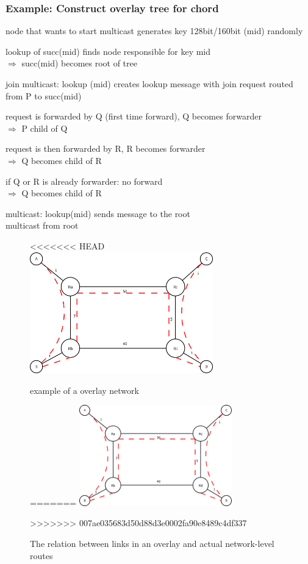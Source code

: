 \documentclass[ngerman,a4paper]{report}
\begin{document}
\subsubsection*{Example: Construct overlay tree for chord}  
\begin{compactitem}
	\item node that wants to start multicast generates key 128bit/160bit (mid) randomly
	\item lookup of succ(mid) finds node responsible for key mid\\
		$\Rightarrow$ succ(mid) becomes root of tree
	\item join multicast: lookup (mid) creates lookup message with join request routed from P to succ(mid)
	\item request is forwarded by Q (first time forward), Q becomes forwarder\\
		$\Rightarrow$ P child of Q
	\item request is then forwarded by R, R becomes forwarder\\
		$\Rightarrow$ Q becomes child of R
	\item if Q or R is already forwarder: no forward\\
		$\Rightarrow$ Q becomes child of R	
	\item multicast: lookup(mid) sends message to the root\\
		multicast from root
\end{compactitem}

\begin{figure}[h]
	\centering
<<<<<<< HEAD
	\includegraphics[width=300px]{gfx/overlay_example.png}
	\caption{example of a overlay network}
=======
	\includegraphics[width=250px]{gfx/overlay_example.png}
	\caption{The relation between links in an overlay and actual network-level routes}
>>>>>>> 007ae035683d50d88d3e0002fa90e8489c4df337
	\label{img:ovrlnt}
\end{figure}
\end{document}
